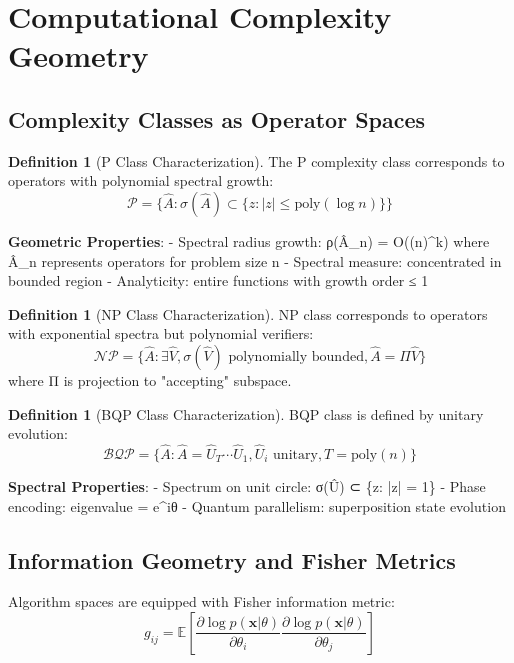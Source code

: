 \documentclass[12pt]{article}
\theoremstyle{plain}
\theoremstyle{definition}
\newtheorem{definition}[theorem]{Definition}
\begin{document}
\section{Computational Complexity Geometry}

\subsection{Complexity Classes as Operator Spaces}

\begin{definition}[P Class Characterization]
The P complexity class corresponds to operators with polynomial spectral growth:
$$\mathcal{P} = \{\hat{A}: \sigma(\hat{A}) \subset \{z: |z| \leq \text{poly}(\log n)\}\}$$
\end{definition}

\textbf{Geometric Properties}:
- Spectral radius growth: ρ(Â_n) = O((\log n)^k) where Â_n represents operators for problem size n
- Spectral measure: concentrated in bounded region
- Analyticity: entire functions with growth order ≤ 1

\begin{definition}[NP Class Characterization]
NP class corresponds to operators with exponential spectra but polynomial verifiers:
$$\mathcal{NP} = \{\hat{A}: \exists \hat{V}, \sigma(\hat{V}) \text{ polynomially bounded}, \hat{A} = \Pi \hat{V}\}$$
where Π is projection to "accepting" subspace.
\end{definition}

\begin{definition}[BQP Class Characterization]
BQP class is defined by unitary evolution:
$$\mathcal{BQP} = \{\hat{A}: \hat{A} = \hat{U}_T \cdots \hat{U}_1, \hat{U}_i \text{ unitary}, T = \text{poly}(n)\}$$
\end{definition}

\textbf{Spectral Properties}:
- Spectrum on unit circle: σ(Û) ⊂ \{z: |z| = 1\}
- Phase encoding: eigenvalue = e^{iθ}
- Quantum parallelism: superposition state evolution

\subsection{Information Geometry and Fisher Metrics}

Algorithm spaces are equipped with Fisher information metric:
$$g_{ij} = \mathbb{E}\left[\frac{\partial \log p(\mathbf{x}|\theta)}{\partial \theta_i} \frac{\partial \log p(\mathbf{x}|\theta)}{\partial \theta_j}\right]$$
\end{document}
